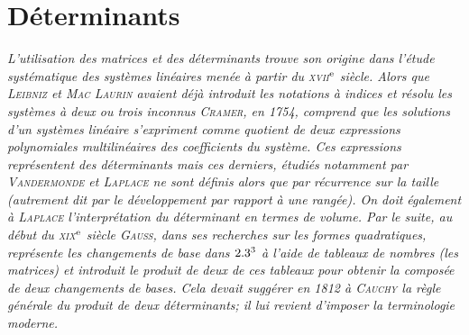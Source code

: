 \chapter{Déterminants}

\textsl{L'utilisation des matrices et des déterminants trouve son origine dans l'étude systématique des systèmes linéaires menée à partir du \textsc{xvii}$^{\mathrm{e}}$ siècle. Alors que \textsc{Leibniz} et \textsc{Mac Laurin} avaient déjà introduit les notations à indices et résolu les systèmes à deux ou trois inconnus \textsc{Cramer}, en 1754, comprend que les solutions d'un systèmes linéaire s'expriment comme quotient de deux expressions polynomiales multilinéaires des coefficients du système. Ces expressions représentent des déterminants mais ces derniers, étudiés notamment par \textsc{Vandermonde} et \textsc{Laplace} ne sont définis alors que par récurrence sur la taille (autrement dit par le développement par rapport à une rangée). On doit également à \textsc{Laplace} l'interprétation du déterminant en termes de volume. Par le suite, au début du \textsc{xix}$^{\mathrm{e}}$ siècle \textsc{Gauss}, dans ses recherches sur les formes quadratiques, représente les changements de base dans $2.3^3$ à l'aide de tableaux de nombres (les matrices) et introduit le produit de deux de ces tableaux pour obtenir la composée de deux changements de bases. Cela devait suggérer en 1812 à \textsc{Cauchy} la règle générale du produit de deux déterminants; il lui revient d'imposer la terminologie moderne.}

\begin{marginfigure}[-8cm]
   
\end{marginfigure}


